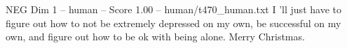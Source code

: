\begin{textsample}{NEG Dim 1 – human – Score 1.00 – human/t470\_human.txt}  \label{ex:f1_neg_011}
I 'll just have to figure out how to not be extremely depressed on my own, be successful on my own, and figure out how to be ok with being alone.
Merry Christmas.

\end{textsample}
